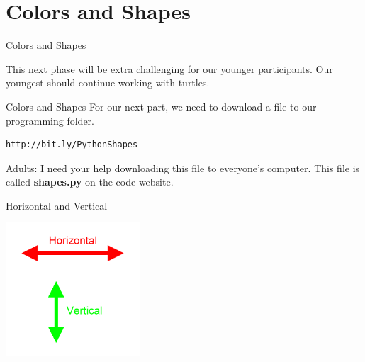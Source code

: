 \documentclass{beamer}
\begin{document}
\section{Colors and Shapes}

\begin{frame}{Colors and Shapes}

This next phase will be extra challenging for our younger participants. Our youngest should continue working with turtles.

\end{frame}

\begin{frame}[fragile]{Colors and Shapes}
For our next part, we need to download a file to our programming folder.

\begin{verbatim}
http://bit.ly/PythonShapes
\end{verbatim}

Adults: I need your help downloading this file to everyone's computer. This file is called \textbf{shapes.py} on the code website.

\end{frame}

\begin{frame}{Horizontal and Vertical}

\includegraphics[width=50mm]{images/horizontalVertical.png}

\end{frame}
\end{document}
